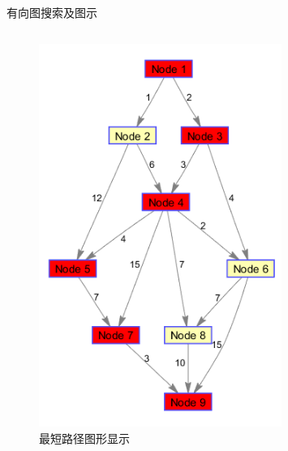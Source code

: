 \documentclass[10pt]{beamer}
\begin{document}
\begin{frame}[allowframebreaks]{有向图搜索及图示}
\begin{columns}[T]
    \begin{figure}[htp]
      \centering
      \includegraphics[width = 0.9\textwidth]{72.png}
      \caption{最短路径图形显示}
    \end{figure}
	\end{columns}

\end{frame}
\end{document}
